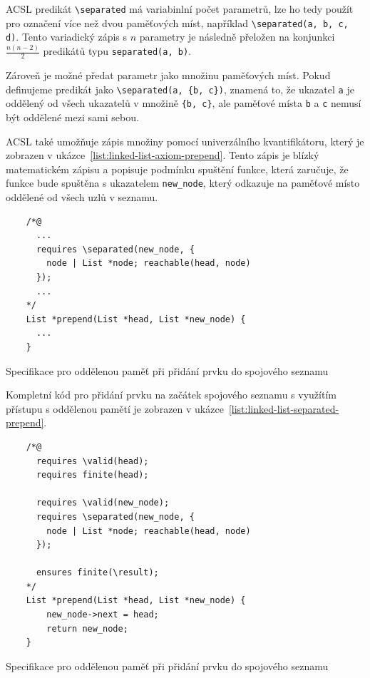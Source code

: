 ACSL predikát \texttt{\textbackslash separated} má variabinlní počet parametrů,
lze ho tedy použít pro označení více než dvou paměťových míst, například
\texttt{\textbackslash separated(a, b, c, d)}.
Tento variadický zápis s $n$ parametry
je následně přeložen na konjunkci $\frac{n(n-2)}{2}$ predikátů typu \texttt{separated(a, b)}.

Zároveň je možné předat parametr jako množinu paměťových míst.
Pokud definujeme predikát jako \texttt{\textbackslash separated(a, \{b, c\})},
znamená to, že ukazatel \texttt{a} je oddělený od všech ukazatelů v množině \texttt{\{b, c\}},
ale paměťové místa \texttt{b} a \texttt{c} nemusí být oddělené mezi sami sebou.

ACSL také umožňuje zápis množiny pomocí univerzálního kvantifikátoru,
který je zobrazen v ukázce~\ref{list:linked-list-axiom-prepend}.
Tento zápis je blízký matematickém zápisu a popisuje podmínku spuštění funkce,
která zaručuje, že funkce bude spuštěna s ukazatelem \texttt{new\_node},
který odkazuje na paměťové místo oddělené od všech uzlů v seznamu.

\begin{listing}[H]
    \begin{verbatim}
    /*@
      ...
      requires \separated(new_node, {
        node | List *node; reachable(head, node)
      });
      ...
    */
    List *prepend(List *head, List *new_node) {
      ...
    }
    \end{verbatim}
    \caption{Specifikace pro oddělenou paměť při přidání prvku do spojového seznamu}
    \label{list:linked-list-axiom-prepend}
\end{listing}

Kompletní kód pro přidání prvku na začátek spojového seznamu
s využítím přístupu s oddělenou pamětí je zobrazen v ukázce~\ref{list:linked-list-separated-prepend}.

\begin{listing}[H]
    \begin{verbatim}
    /*@
      requires \valid(head);
      requires finite(head);

      requires \valid(new_node);
      requires \separated(new_node, {
        node | List *node; reachable(head, node)
      });

      ensures finite(\result);
    */
    List *prepend(List *head, List *new_node) {
        new_node->next = head;
        return new_node;
    }
    \end{verbatim}
    \caption{Specifikace pro oddělenou paměť při přidání prvku do spojového seznamu}
    \label{list:linked-list-separated-prepend}
\end{listing}

